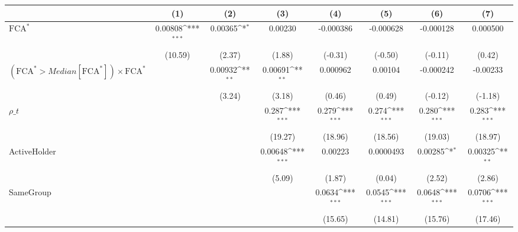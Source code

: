 {
\def\sym#1{\ifmmode^{#1}\else\(^{#1}\)\fi}
\begin{tabular}{l*{7}{c}}
\hline\hline
                    &\multicolumn{1}{c}{(1)}         &\multicolumn{1}{c}{(2)}         &\multicolumn{1}{c}{(3)}         &\multicolumn{1}{c}{(4)}         &\multicolumn{1}{c}{(5)}         &\multicolumn{1}{c}{(6)}         &\multicolumn{1}{c}{(7)}         \\
\hline
$ \text{FCA}^* $    &     0.00808\sym{***}&     0.00365\sym{*}  &     0.00230         &   -0.000386         &   -0.000628         &   -0.000128         &    0.000500         \\
                    &     (10.59)         &      (2.37)         &      (1.88)         &     (-0.31)         &     (-0.50)         &     (-0.11)         &      (0.42)         \\
[1em]
 $ (\text{FCA}^* > Median[\text{FCA}^*]) \times {\text{FCA} ^*}  $ &                     &     0.00932\sym{**} &     0.00691\sym{**} &    0.000962         &     0.00104         &   -0.000242         &    -0.00233         \\
                    &                     &      (3.24)         &      (3.18)         &      (0.46)         &      (0.49)         &     (-0.12)         &     (-1.18)         \\
[1em]
$ \rho\_t $          &                     &                     &       0.287\sym{***}&       0.279\sym{***}&       0.274\sym{***}&       0.280\sym{***}&       0.283\sym{***}\\
                    &                     &                     &     (19.27)         &     (18.96)         &     (18.56)         &     (19.03)         &     (18.97)         \\
[1em]
ActiveHolder        &                     &                     &     0.00648\sym{***}&     0.00223         &   0.0000493         &     0.00285\sym{*}  &     0.00325\sym{**} \\
                    &                     &                     &      (5.09)         &      (1.87)         &      (0.04)         &      (2.52)         &      (2.86)         \\
[1em]
SameGroup           &                     &                     &                     &      0.0634\sym{***}&      0.0545\sym{***}&      0.0648\sym{***}&      0.0706\sym{***}\\
                    &                     &                     &                     &     (15.65)         &     (14.81)         &     (15.76)         &     (17.46)         \\

\end{tabular}}
